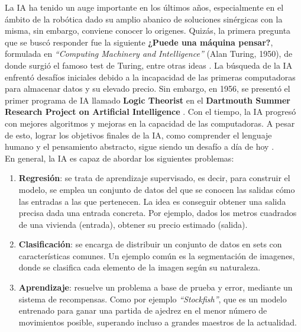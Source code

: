 La \ac{IA} ha tenido un auge importante en los últimos años, especialmente en el ámbito de la robótica dado su amplio abanico de soluciones sinérgicas con la misma, sin embargo, conviene conocer lo origenes. Quizás, la primera pregunta que se buscó responder fue la siguiente \textbf{¿Puede una máquina pensar?}, formulada en \emph{``Computing Machinery and Intelligence''} (Alan Turing, 1950), de donde surgió el famoso test de Turing, entre otras ideas \cite{turing-paper}. La búsqueda de la \ac{IA} enfrentó desafíos iniciales debido a la incapacidad de las primeras computadoras para almacenar datos y su elevado precio. Sin embargo, en 1956, se presentó el primer programa de \ac{IA} llamado \textbf{Logic Theorist} en el \textbf{Dartmouth Summer Research Project on Artificial Intelligence} \cite{logic-theorist}. Con el tiempo, la IA progresó con mejores algoritmos y mejoras en la capacidad de las computadoras. A pesar de esto, lograr los objetivos finales de la IA, como comprender el lenguaje humano y el pensamiento abstracto, sigue siendo un desafío a día de hoy \cite{history-ai}.\\

En general, la \ac{IA} es capaz de abordar los siguientes problemas:

\begin{enumerate}
	\item \textbf{Regresión}: se trata de aprendizaje supervisado, es decir, para construir el modelo, se emplea un conjunto de datos del que se conocen las salidas cómo las entradas a las que pertenecen. La idea es conseguir obtener una salida precisa dada una entrada concreta. Por ejemplo, dados los metros cuadrados de una vivienda (entrada), obtener su precio estimado (salida).

	\item \textbf{Clasificación}: se encarga de distribuir un conjunto de datos en sets con características comunes. Un ejemplo común es la segmentación de imagenes, donde se clasifica cada elemento de la imagen según su naturaleza.
	
    \item \textbf{Aprendizaje}: resuelve un problema a base de prueba y error, mediante un sistema de recompensas. Como por ejemplo \emph{``Stockfish''}, que es un modelo entrenado para ganar una partida de ajedrez en el menor número de movimientos posible, superando incluso a grandes maestros de la actualidad.
\end{enumerate} \cite{reg-class} \cite{chess}

